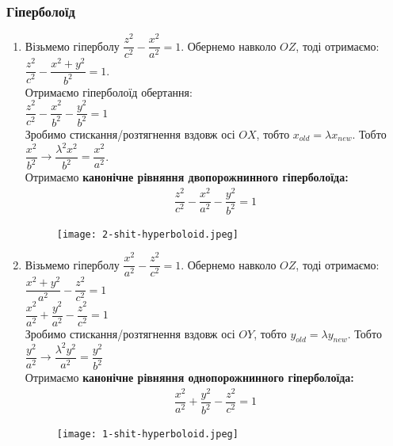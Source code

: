 \documentclass[a4paper, 10pt]{extarticle}
\theoremstyle{theoremdd}
\theoremstyle{theoremdd}
\theoremstyle{theoremdd}
\theoremstyle{theoremdd}
\theoremstyle{theoremdd}
\theoremstyle{theoremdd}
\theoremstyle{theoremdd}
\theoremstyle{theoremdd}
\begin{document}
\subsubsection{Гіперболоїд}
\begin{enumerate}[wide=0pt,label={\Roman*.}]
\item Візьмемо гіперболу $\dfrac{z^2}{c^2} - \dfrac{x^2}{a^2} = 1$. Обернемо навколо $OZ$, тоді отримаємо:\\
$\dfrac{z^2}{c^2} - \dfrac{x^2+y^2}{b^2} = 1$.\\
Отримаємо гіперболоїд обертання:\\
$\dfrac{z^2}{c^2} - \dfrac{x^2}{b^2} - \dfrac{y^2}{b^2} = 1$\\
Зробимо стискання/розтягнення вздовж осі $OX$, тобто $x_{old} = \lambda x_{new}$. Тобто $\dfrac{x^2}{b^2} \to \dfrac{\lambda^2 x^2}{b^2} = \dfrac{x^2}{a^2}$.\\
Отримаємо \textbf{канонічне рівняння двопорожнинного гіперболоїда:}
\begin{align*}
\dfrac{z^2}{c^2} - \dfrac{x^2}{a^2} - \dfrac{y^2}{b^2} = 1
\end{align*}
\begin{figure}[H]
\centering
\texttt{[image: 2-shit-hyperboloid.jpeg]}
\end{figure}

\item Візьмемо гіперболу $\dfrac{x^2}{a^2} - \dfrac{z^2}{c^2} = 1$. Обернемо навколо $OZ$, тоді отримаємо:\\
$\dfrac{x^2+y^2}{a^2} - \dfrac{z^2}{c^2} = 1$\\
$\dfrac{x^2}{a^2} + \dfrac{y^2}{a^2} - \dfrac{z^2}{c^2} = 1$\\
Зробимо стискання/розтягнення вздовж осі $OY$, тобто $y_{old} = \lambda y_{new}$. Тобто $\dfrac{y^2}{a^2} \to \dfrac{\lambda^2 y^2}{a^2} = \dfrac{y^2}{b^2}$\\
Отримаємо \textbf{канонічне рівняння однопорожнинного гіперболоїда:}
\begin{align*}
\dfrac{x^2}{a^2} + \dfrac{y^2}{b^2} - \dfrac{z^2}{c^2} = 1
\end{align*}

\begin{figure}[H]
\centering
\texttt{[image: 1-shit-hyperboloid.jpeg]}
\end{figure}
\end{enumerate}
\end{document}
